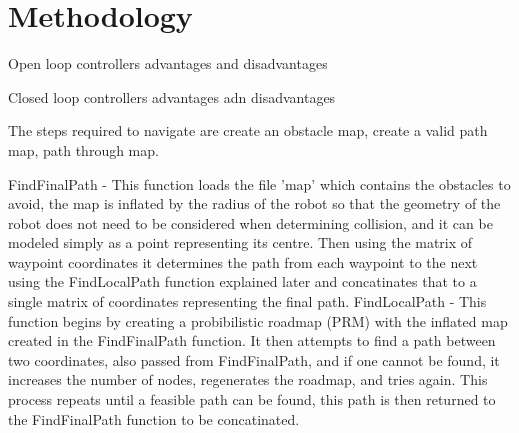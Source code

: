 \documentclass{ieeeaccess}
\begin{document}
\section{Methodology}
\label{sec:meth}
Open loop controllers advantages and disadvantages\par
Closed loop controllers advantages adn disadvantages\par
The steps required to navigate are create an obstacle map, create a valid path map, path through map.\par
FindFinalPath - This function loads the file 'map' which contains the obstacles to avoid, the map is inflated by the radius of the robot so that the geometry of the robot does not need to be considered when determining collision, and it can be modeled simply as a point representing its centre. Then using the matrix of waypoint coordinates it determines the path from each waypoint to the next using the FindLocalPath function explained later and concatinates that to a single matrix of coordinates representing the final path.
FindLocalPath - This function begins by creating a probibilistic roadmap (PRM) with the inflated map created in the FindFinalPath function. It then attempts to find a path between two coordinates, also passed from FindFinalPath, and if one cannot be found, it increases the number of nodes, regenerates the roadmap, and tries again. This process repeats until a feasible path can be found, this path is then returned to the FindFinalPath function to be concatinated.

\end{document}
